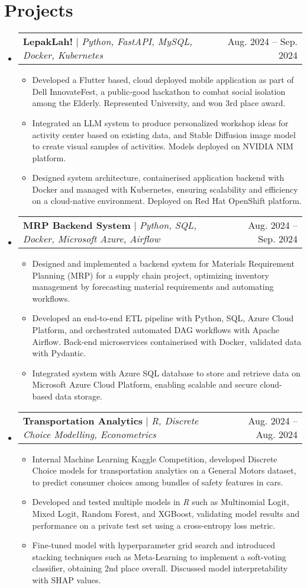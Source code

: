 \documentclass[letterpaper,11pt]{article}
\makeatletter
\newcommand{\resumeItem}[1]{
  \item\small{
    {#1 \vspace{-2pt}}
  }
}
\newcommand{\resumeProjectHeading}[2]{
    \item
    \begin{tabular*}{1.001\textwidth}{l@{\extracolsep{\fill}}r}
      \small#1 & \small #2\\
    \end{tabular*}\vspace{-7pt}
}
\newcommand{\resumeSubHeadingListStart}{\begin{itemize}[leftmargin=0.0in, label={}]}
\newcommand{\resumeSubHeadingListEnd}{\end{itemize}}
\newcommand{\resumeItemListStart}{\begin{itemize}}
\newcommand{\resumeItemListEnd}{\end{itemize}\vspace{-5pt}}
\makeatother
\begin{document}
\section{Projects}
    \vspace{-5pt}
    \resumeSubHeadingListStart
      \resumeProjectHeading
          {\textbf{LepakLah!} $|$ \emph{Python, FastAPI, MySQL, Docker, Kubernetes}}{Aug. 2024 -- Sep. 2024}
          \resumeItemListStart
            \resumeItem{Developed a Flutter based, cloud deployed mobile application as part of Dell InnovateFest, a public-good hackathon to combat social isolation among the Elderly. Represented University, and won 3rd place award.}
            \resumeItem{Integrated an LLM system to produce personalized workshop ideas for activity center based on existing data, and Stable Diffusion image model to create visual samples of activities. Models deployed on NVIDIA NIM platform.}
            \resumeItem{Designed system architecture, containerised application backend with Docker and managed with Kubernetes, ensuring scalability and efficiency on a cloud-native environment. Deployed on Red Hat OpenShift platform.}
          \resumeItemListEnd
    \vspace{-12pt}
      \resumeProjectHeading
          {\textbf{MRP Backend System} $|$ \emph{Python, SQL, Docker, Microsoft Azure, Airflow}}{Aug. 2024 -- Sep. 2024}
          \resumeItemListStart
            \resumeItem{Designed and implemented a backend system for Materials Requirement Planning (MRP) for a supply chain project, optimizing inventory management by forecasting material requirements and automating workflows.}
            \resumeItem{Developed an end-to-end ETL pipeline with Python, SQL, Azure Cloud Platform, and orchestrated automated DAG workflows with Apache Airflow. Back-end microservices containerised with Docker, validated data with Pydantic.}
            \resumeItem{Integrated system with Azure SQL database to store and retrieve data on Microsoft Azure Cloud Platform, enabling scalable and secure cloud-based data storage.}
          \resumeItemListEnd
    \vspace{-12pt}
      \resumeProjectHeading
          {\textbf{Transportation Analytics} $|$ \emph{R, Discrete Choice Modelling, Econometrics}}{Aug. 2024 -- Aug. 2024}
          \resumeItemListStart
            \resumeItem{Internal Machine Learning Kaggle Competition, developed Discrete Choice models for transportation analytics on a General Motors dataset, to predict consumer choices among bundles of safety features in cars.}
            \resumeItem{Developed and tested multiple models in \emph{R} such as Multinomial Logit, Mixed Logit, Random Forest, and XGBoost, validating model results and performance on a private test set using a cross-entropy loss metric.}
            \resumeItem{Fine-tuned model with hyperparameter grid search and introduced stacking techniques such as Meta-Learning to implement a soft-voting classifier, obtaining 2nd place overall. Discussed model interpretability with SHAP values.}
          \resumeItemListEnd
    \resumeSubHeadingListEnd
\end{document}
